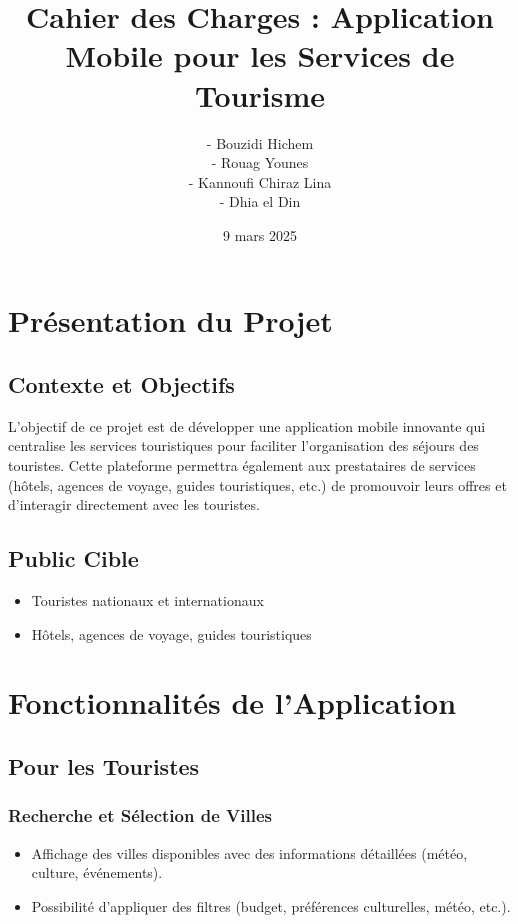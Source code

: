 \documentclass[12pt]{article}
\title{Cahier des Charges : Application Mobile pour les Services de Tourisme}
\author{- Bouzidi Hichem \\ - Rouag Younes \\ - Kannoufi Chiraz Lina \\ - Dhia el Din}
\date{9 mars 2025}
\begin{document}
\maketitle

\section{Présentation du Projet}

\subsection{Contexte et Objectifs}
L’objectif de ce projet est de développer une application mobile innovante qui centralise les services touristiques pour faciliter l’organisation des séjours des touristes. Cette plateforme permettra également aux prestataires de services (hôtels, agences de voyage, guides touristiques, etc.) de promouvoir leurs offres et d’interagir directement avec les touristes.

\subsection{Public Cible}
\begin{itemize}
    \item Touristes nationaux et internationaux
    \item Hôtels, agences de voyage, guides touristiques
\end{itemize}

\section{Fonctionnalités de l’Application}

\subsection{Pour les Touristes}

\subsubsection{Recherche et Sélection de Villes}
\begin{itemize}
    \item Affichage des villes disponibles avec des informations détaillées (météo, culture, événements).
    \item Possibilité d’appliquer des filtres (budget, préférences culturelles, météo, etc.).
\end{itemize}
\end{document}
